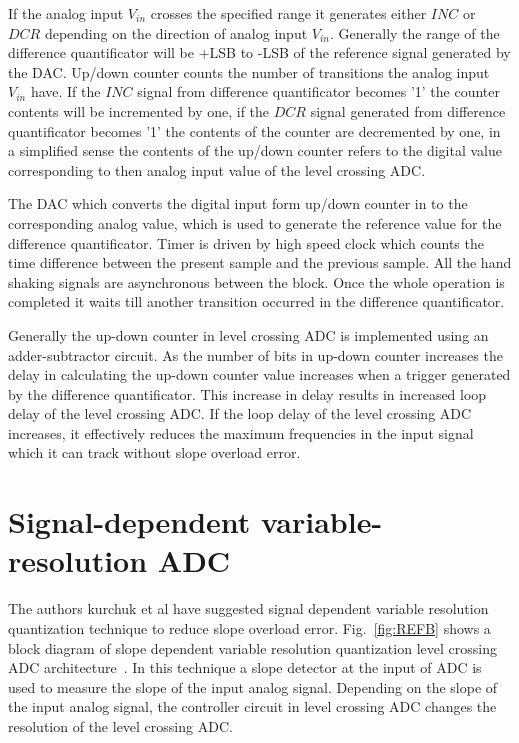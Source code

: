 \par
\hspace{0.6cm}If the analog input $V_{in}$ crosses the specified range it generates either $INC$ or $DCR$ depending on the direction of analog input $V_{in}$. Generally the range of the difference quantificator will be +LSB to -LSB of the reference signal generated by the DAC. Up/down counter counts the number of transitions the analog input $V_{in}$ have. If the $INC$ signal from difference quantificator becomes '1' the counter contents will be incremented by one, if the $DCR$ signal generated from difference quantificator becomes '1' the contents of the counter are decremented by one, in a simplified sense the contents of the up/down counter refers to the digital value corresponding to then analog input value of the level crossing ADC. 

\par
\hspace{0.6cm} The DAC which converts the digital input form  up/down counter in to the corresponding analog value, which is used to generate the reference value for the difference quantificator. Timer is driven by high speed clock which counts the time difference between the present sample and the previous sample. All the hand shaking signals are asynchronous between the block. Once the whole operation is completed it waits till another transition occurred in the difference quantificator. 

\par
\hspace{0.6cm} 	Generally the up-down counter in level crossing ADC is implemented using an adder-subtractor circuit. As the number of bits in up-down counter increases the delay in calculating the up-down counter value increases when a trigger generated by the difference quantificator. This increase in delay results in increased loop delay of the level crossing ADC. If the loop delay of the  level crossing ADC increases, it effectively reduces the maximum frequencies in the input signal which it can track without slope overload error. 




\section{ Signal-dependent variable-resolution ADC}


\par
\hspace{0.6cm} The authors kurchuk et al have suggested signal dependent variable resolution quantization technique to reduce slope overload error. Fig.~\ref{fig:REFB} shows a block diagram of slope dependent variable resolution quantization level crossing ADC architecture~\cite{kurchuk2009signal}. In this technique a slope detector at the input of ADC is used to measure the slope of the input analog signal. Depending on the slope of the input analog signal, the controller circuit in level crossing ADC changes the resolution of the level crossing ADC. 

